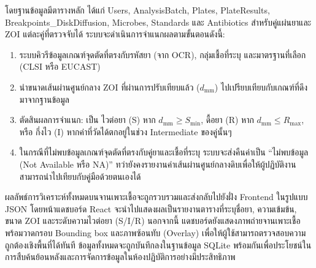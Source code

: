 โดยฐานข้อมูลมีตารางหลัก ได้แก่ Users, AnalysisBatch, Plates, PlateResults, Breakpoints\_DiskDiffusion, Microbes, Standards และ Antibiotics สำหรับคู่แผ่นยาและ ZOI แต่ละคู่ที่ตรวจจับได้ ระบบจะดำเนินการจำแนกผลตามขั้นตอนดังนี้:
\begin{enumerate}
  \item ระบบคิวรีข้อมูลเกณฑ์จุดตัดที่ตรงกับรหัสยา (จาก OCR), กลุ่มเชื้อที่ระบุ และมาตรฐานที่เลือก (CLSI หรือ EUCAST)
  \item นำขนาดเส้นผ่านศูนย์กลาง ZOI ที่ผ่านการปรับเทียบแล้ว ($d_{\mathrm{mm}}$) ไปเปรียบเทียบกับเกณฑ์ที่ดึงมาจากฐานข้อมูล
  \item ตัดสินผลการจำแนก: เป็น ไวต่อยา (S) หาก $d_{\mathrm{mm}} \geq S_{\min}$, ดื้อยา (R) หาก $d_{\mathrm{mm}} \leq R_{\max}$, หรือ กึ่งไว (I) หากค่าที่วัดได้ตกอยู่ในช่วง Intermediate ของคู่นั้นๆ
  \item ในกรณีที่ไม่พบข้อมูลเกณฑ์จุดตัดที่ตรงกับคู่ยาและเชื้อที่ระบุ ระบบจะส่งคืนค่าเป็น ``ไม่พบข้อมูล (Not Available หรือ NA)'' ทว่ายังคงรายงานค่าเส้นผ่านศูนย์กลางดิบเพื่อให้ผู้ปฏิบัติงานสามารถนำไปเทียบกับคู่มือด้วยตนเองได้
\end{enumerate}

ผลลัพธ์การวิเคราะห์ทั้งหมดบนจานเพาะเชื้อจะถูกรวบรวมและส่งกลับไปยังฝั่ง Frontend ในรูปแบบ JSON โดยหน้าแดชบอร์ด React จะนำไปแสดงผลเป็นรายงานตารางที่ระบุชื่อยา, ความเข้มข้น, ขนาด ZOI และระดับความไวต่อยา (S/I/R) นอกจากนี้ แดชบอร์ดยังแสดงภาพถ่ายจานเพาะเชื้อพร้อมวาดกรอบ Bounding box และภาพซ้อนทับ (Overlay) เพื่อให้ผู้ใช้สามารถตรวจสอบความถูกต้องเชิงพื้นที่ได้ทันที ข้อมูลทั้งหมดจะถูกบันทึกลงในฐานข้อมูล SQLite พร้อมกันเพื่อประโยชน์ในการสืบค้นย้อนหลังและการจัดการข้อมูลในห้องปฏิบัติการอย่างมีประสิทธิภาพ
